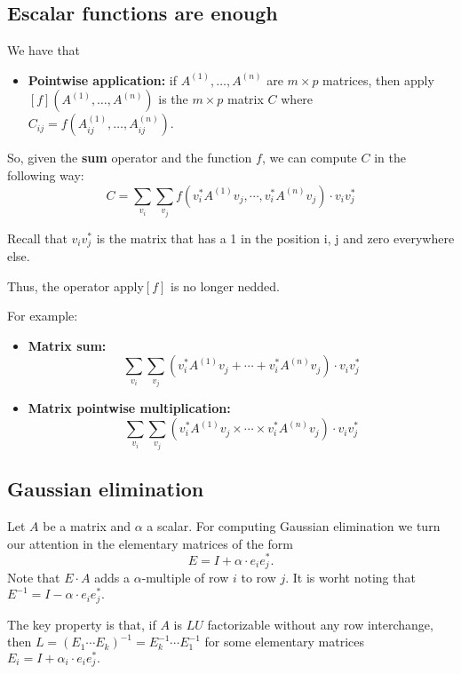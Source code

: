 \subsection*{Escalar functions are enough}

We have that 

\begin{itemize}
	\item \textbf{Pointwise application:} if $A^{(1)}, \ldots, A^{(n)}$ are $m\times p$ matrices, then apply$\left[ f \right](A^{(1)}, \ldots, A^{(n)})$ is the $m\times p$ matrix $C$ where $C_{ij}=f(A^{(1)}_{ij}, \ldots, A^{(n)}_{ij})$.
\end{itemize}

So, given the \textbf{sum} operator and the function $f$, we can compute $C$ in the following way: $$C=\sum_{v_i}\sum_{v_j}f\left( v_i^*A^{(1)}v_j, \cdots, v_i^*A^{(n)}v_j\right)\cdot v_iv_j^*$$

Recall that $v_iv_j^*$ is the matrix that has a 1 in the position i, j and zero everywhere else.

Thus, the operator apply$\left[ f \right]$ is no longer nedded.

For example:

\begin{itemize}
	\item \textbf{Matrix sum:}$$\sum_{v_i}\sum_{v_j}\left( v_i^*A^{(1)}v_j+ \cdots + v_i^*A^{(n)}v_j\right)\cdot v_iv_j^*$$
	\item \textbf{Matrix pointwise multiplication:} $$\sum_{v_i}\sum_{v_j}\left( v_i^*A^{(1)}v_j\times \cdots\times v_i^*A^{(n)}v_j\right)\cdot v_iv_j^*$$
\end{itemize}

\subsection*{Gaussian elimination}

Let $A$ be a matrix and $\alpha$ a scalar. For computing Gaussian elimination we turn our attention in the elementary matrices of the form $$E=I + \alpha\cdot e_ie_j^*.$$ Note that $E\cdot A$ adds a $\alpha$-multiple of row $i$ to row $j$. It is worht noting that $E^{-1}= I - \alpha\cdot e_ie_j^*.$

The key property is that, if $A$ is $LU$ factorizable without any row interchange, then $L=(E_1\cdots E_k)^{-1}=E_k^{-1}\cdots E_1^{-1}$ for some elementary matrices $E_i=I + \alpha_i\cdot e_ie_j^*.$

\label{sec:iteration}
